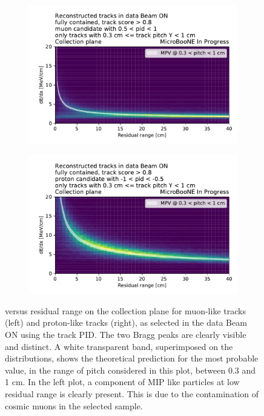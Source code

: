 \begin{figure}[H] 
\begin{center}
    \begin{subfigure}[b]{0.48\textwidth}
    \centering
    \includegraphics[width=1.00\textwidth]{llrpid/pdg_muon_03_pitch_10.pdf}
    \end{subfigure}
    \begin{subfigure}[b]{0.48\textwidth}
    \centering
    \includegraphics[width=1.00\textwidth]{llrpid/pdg_proton_03_pitch_10.pdf}
    \end{subfigure}
\caption{\dedx versus residual range on the collection plane for muon-like tracks (left) and proton-like tracks (right), as selected in the data Beam ON using the track PID.
The two Bragg peaks are clearly visible and distinct.
A white transparent band, superimposed on the distributions, shows the theoretical prediction for the most probable value, in the range of pitch considered in this plot, between 0.3 and 1 cm.
In the left plot, a component of MIP like particles at low residual range is clearly present.
This is due to the contamination of cosmic muons in the selected sample.}
\label{fig:llr_pid_pdf_example}
\end{center}
\end{figure}

